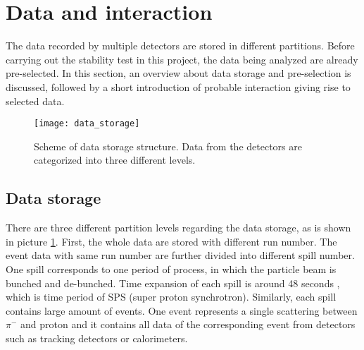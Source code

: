 

\section{Data and interaction}
The data recorded by multiple detectors are stored in different partitions. Before carrying out the stability test in this project, the data being analyzed are already pre-selected. In this section, an overview about data storage and pre-selection is discussed, followed by a short introduction of probable interaction giving rise to selected data.

\begin{figure}[t!]
	\centering
	\texttt{[image: data\_storage]}
	\caption{Scheme of data storage structure. Data from the detectors are categorized into three different levels.}
	\label{fig:data_storage}
\end{figure}

\subsection{Data storage}
There are three different partition levels regarding the data storage, as is shown in picture \ref{fig:data_storage}. First, the whole data are stored with different run number. The event data with same run number are further divided into different spill number. One spill corresponds to one period of process, in which the particle beam is bunched and de-bunched. Time expansion of each spill is around 48 seconds \cite{COMPASS}, which is time period of SPS (super proton synchrotron). Similarly, each spill contains large amount of events. One event represents a single scattering between $\pi^-$ and proton and it contains all data of the corresponding event from detectors such as tracking detectors or calorimeters.

